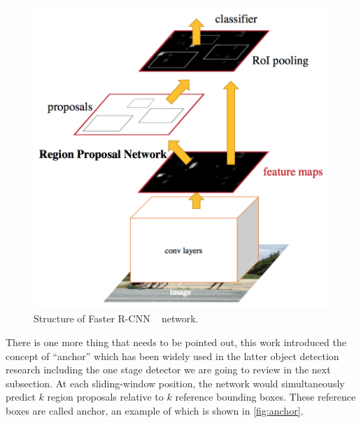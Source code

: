\begin{figure}
    \begin{center}
        \includegraphics[scale=0.5]{figures/faster_r_cnn.png}
    \end{center}
    \caption{Structure of Faster R-CNN ~\protect\cite{faster-r-cnn-paper-2015} 
    network.}
    \label{fig:faster-r-cnn}
\end{figure}

There is one more thing that needs to be pointed out, this work introduced the
concept of ``anchor'' which has been widely
used in the latter object detection research including the one stage
detector we are going to review in the next subsection.
At each sliding-window position, the network would simultaneously predict $k$
region proposals relative to
$k$ reference bounding boxes. These reference boxes are called anchor, an 
example of which is shown in \autoref{fig:anchor}.

